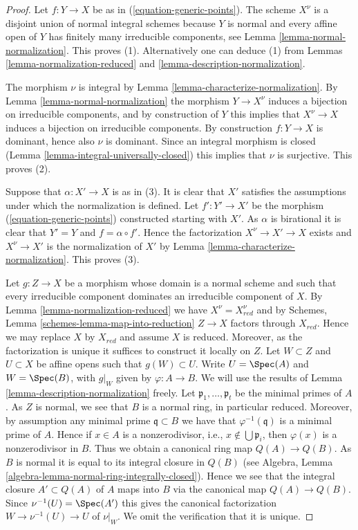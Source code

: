 \begin{proof}
Let $f : Y \to X$ be as in (\ref{equation-generic-points}).
The scheme $X^\nu$ is a disjoint union of normal integral schemes
because $Y$ is normal and every affine open of $Y$ has finitely
many irreducible components, see
Lemma \ref{lemma-normal-normalization}. This proves (1).
Alternatively one can deduce (1) from
Lemmas \ref{lemma-normalization-reduced} and
\ref{lemma-description-normalization}.

\medskip\noindent
The morphism $\nu$ is integral by Lemma \ref{lemma-characterize-normalization}.
By Lemma \ref{lemma-normal-normalization} the
morphism $Y \to X^\nu$ induces a bijection on irreducible components,
and by construction of $Y$ this implies that $X^\nu \to X$ induces
a bijection on irreducible components. By construction $f : Y \to X$
is dominant, hence also $\nu$ is dominant. Since an integral morphism is
closed (Lemma \ref{lemma-integral-universally-closed}) this implies that
$\nu$ is surjective. This proves (2).

\medskip\noindent
Suppose that $\alpha : X' \to X$ is as in (3). It is clear that
$X'$ satisfies the assumptions under which the normalization
is defined. Let $f' : Y' \to X'$ be the morphism
(\ref{equation-generic-points}) constructed starting with $X'$.
As $\alpha$ is birational it is clear that $Y' = Y$ and $f = \alpha \circ f'$.
Hence the factorization $X^\nu \to X' \to X$ exists
and $X^\nu \to X'$ is the normalization of $X'$ by
Lemma \ref{lemma-characterize-normalization}. This proves (3).

\medskip\noindent
Let $g : Z \to X$ be a morphism whose domain is a normal scheme
and such that every irreducible component dominates an irreducible
component of $X$. By Lemma \ref{lemma-normalization-reduced}
we have $X^\nu = X_{red}^\nu$ and by
Schemes, Lemma \ref{schemes-lemma-map-into-reduction}
$Z \to X$ factors through $X_{red}$. Hence we may replace $X$ by
$X_{red}$ and assume $X$ is reduced. Moreover, as the factorization
is unique it suffices to construct it locally on $Z$.
Let $W \subset Z$ and $U \subset X$ be affine opens
such that $g(W) \subset U$. Write $U = \Spec(A)$ and
$W = \Spec(B)$, with $g|_W$ given by $\varphi : A \to B$.
We will use the results of Lemma \ref{lemma-description-normalization} freely.
Let $\mathfrak p_1, \ldots, \mathfrak p_t$ be the minimal primes of $A$.
As $Z$ is normal, we see that $B$ is a normal
ring, in particular reduced. Moreover, by assumption any minimal
prime $\mathfrak q \subset B$ we have that $\varphi^{-1}(\mathfrak q)$
is a minimal prime of $A$. Hence if $x \in A$ is a nonzerodivisor, i.e.,
$x \not \in \bigcup \mathfrak p_i$, then $\varphi(x)$ is a nonzerodivisor
in $B$. Thus we obtain a canonical ring map $Q(A) \to Q(B)$. As $B$ is
normal it is equal to its integral closure in $Q(B)$ (see
Algebra, Lemma \ref{algebra-lemma-normal-ring-integrally-closed}).
Hence we see that the integral closure $A' \subset Q(A)$ of $A$
maps into $B$ via the canonical map $Q(A) \to Q(B)$.
Since $\nu^{-1}(U) = \Spec(A')$ this gives the canonical
factorization $W \to \nu^{-1}(U) \to U$ of $\nu|_W$.
We omit the verification that it is unique.
\end{proof}

